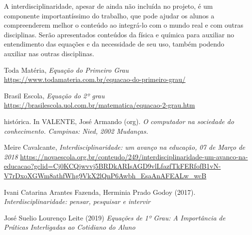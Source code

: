 \documentclass[12pt]{report}
\begin{document}
A interdisciplinaridade, apesar de ainda não incluída no projeto, é um componente importantíssimo do trabalho, que pode ajudar os alunos a compreenderem melhor o conteúdo ao integrá-lo com o mundo real e com outras disciplinas. Serão apresentados conteúdos da física e química para auxiliar no entendimento das equações e da necessidade de seu uso, também podendo auxiliar nas outras disciplinas.

\begin{thebibliography}{9}

\noindent Toda Matéria, 
\textit{Equação do Primeiro Grau}
\url{https://www.todamateria.com.br/equacao-do-primeiro-grau/}

\noindent Brasil Escola, 
\textit{Equação do 2º grau}
\url{https://brasilescola.uol.com.br/matematica/equacao-2-grau.htm}

\noindent histórica. In VALENTE, José Armando (org). 
\textit{O computador na sociedade do conhecimento. Campinas: Nied, 2002 Mudanças.}

\noindent Meire Cavalcante,
\textit{Interdisciplinaridade: um avanço na educação, 07 de Março de 2018}
\url{https://novaescola.org.br/conteudo/249/interdisciplinaridade-um-avanco-na-educacao?gclid=Cj0KCQjwvvj5BRDkARIsAGD9vlLfazfTkFERfofB1vN-V7rDxoXGWm8athfWhg9VkX2lQnP6Awbh_EsaAnAFEALw_wcB}

\noindent Ivani Catarina Arantes Fazenda, Herminia Prado Godoy (2017).
\textit{Interdisciplinaridade: pensar, pesquisar e intervir}

\noindent José Suelio Lourenço Leite (2019)
\textit{Equações de 1º Grau: A Importância de Práticas Interligadas ao Cotidiano do Aluno}

\end{thebibliography}
\end{document}
